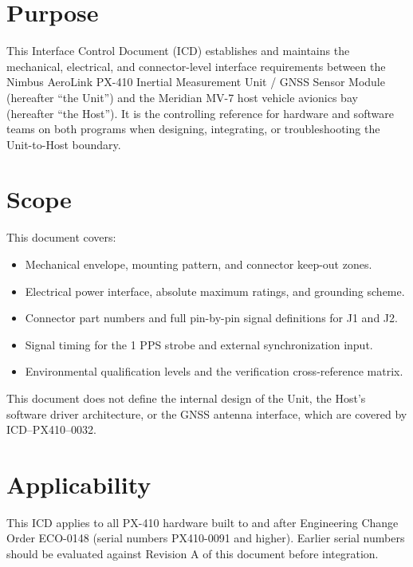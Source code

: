 \documentclass[11pt,a4paper]{scrreprt}
\begin{document}
\section{Purpose}
This Interface Control Document (ICD) establishes and maintains the mechanical, electrical,
and connector-level interface requirements between the Nimbus AeroLink PX-410 Inertial
Measurement Unit / GNSS Sensor Module (hereafter ``the Unit'') and the Meridian MV-7 host
vehicle avionics bay (hereafter ``the Host''). It is the controlling reference for hardware
and software teams on both programs when designing, integrating, or troubleshooting the
Unit-to-Host boundary.

\section{Scope}
This document covers:
\begin{itemize}[leftmargin=*,itemsep=2pt]
  \item Mechanical envelope, mounting pattern, and connector keep-out zones.
  \item Electrical power interface, absolute maximum ratings, and grounding scheme.
  \item Connector part numbers and full pin-by-pin signal definitions for J1 and J2.
  \item Signal timing for the 1 PPS strobe and external synchronization input.
  \item Environmental qualification levels and the verification cross-reference matrix.
\end{itemize}
This document does not define the internal design of the Unit, the Host's software driver
architecture, or the GNSS antenna interface, which are covered by ICD--PX410--0032.

\section{Applicability}
This ICD applies to all PX-410 hardware built to and after Engineering Change Order
ECO-0148 (serial numbers PX410-0091 and higher). Earlier serial numbers should be evaluated
against Revision A of this document before integration.
\end{document}
